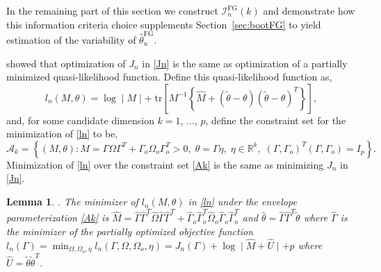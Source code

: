 \documentclass{article}\usepackage[]{graphicx}\usepackage[]{color}
\newcommand{\R}{\mathbb{R}}
\newcommand{\tr}{\text{tr}}
\newcommand{\Mhat}{\widehat{M}}
\newcommand{\That}{\widehat{\theta}}
\newcommand{\TFG}{\widehat{\theta}^{\text{FG}}}
\newcommand{\Ttil}{\widetilde{\theta}}
\newcommand{\Gamhat}{\widehat{\Gamma}}
\newcommand{\Omhat}{\widehat{\Omega}}
\newcommand{\IFG}{\mathcal{I}_n^{\text{FG}}}
\newcommand{\A}{\mathcal{A}}
\newtheorem{lem}{Lemma}
\begin{document}
In the remaining part of this section we construct $\IFG(k)$ and demonstrate how this information criteria choice supplements Section~\ref{sec:bootFG} to yield %
estimation of the variability of $\TFG_u$.

\citet{zhangmai} showed that optimization of $J_n$ in \eqref{Jn} is the same as optimization of a partially minimized quasi-likelihood function. Define this quasi-likelihood function as, 
\begin{equation} \label{ln}
  l_n(M, \theta) = \log\mid M\mid + \; \tr\left[M^{-1}\left\{\Mhat 
    + (\Ttil - \theta)(\Ttil - \theta)^T\right\}\right], 
\end{equation}
and, for some candidate dimension $k = 1$, $\ldots$, $p$, define the constraint set for the minimization of \eqref{ln} to be,
\begin{equation} \label{Ak}
  \A_k = \left\{(M,\theta) : 
    M = \Gamma\Omega\Gamma^T + \Gamma_o\Omega_o\Gamma_o^T > 0, \; 
    \theta = \Gamma\eta, \; \eta \in \R^k, \; 
    (\Gamma, \Gamma_o)^T(\Gamma, \Gamma_o) = I_p
  \right\}.
\end{equation}
Minimization of \eqref{ln} over the constraint set \eqref{Ak} is the same as minimizing $J_n$ in \eqref{Jn}. 

\begin{lem} \label{lem1:lemma1}
\citep[Lemma 3.1]{zhangmai}. The minimizer of $l_n(M,\theta)$ in \eqref{ln} under the envelope parameterization \eqref{Ak} is 
$
  \widehat{M} 
    = \Gamhat\Gamhat^T\Omhat\Gamhat\Gamhat^T 
      + \Gamhat_o\Gamhat_o^T\Omhat_o\Gamhat_o\Gamhat_o^T
$
and $\That = \Gamhat\Gamhat^T\Ttil$ where $\Gamhat$ is the minimizer of the partially optimized objective function 
$
  l_n(\Gamma) = \min_{\Omega,\Omega_o,\eta} l_n(\Gamma,\Omega,\Omega_o,\eta) 
    = J_n(\Gamma) + \log\mid \widehat{M} + \widehat{U} \mid + p
$
where $\widehat{U} = \Ttil\Ttil^T$. 
\end{lem}
\end{document}
